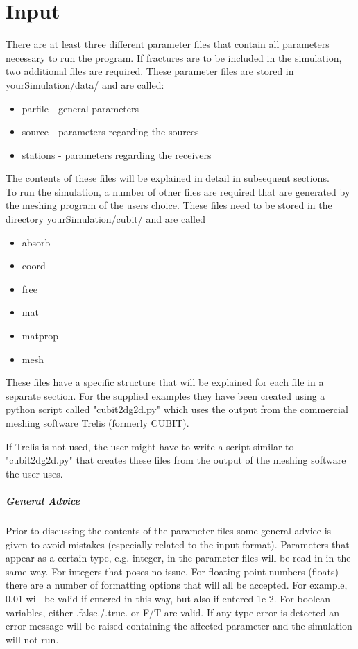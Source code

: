 \chapter{Input}
\label{chap:input}
There are at least three different parameter files that contain all parameters necessary to run the program. If fractures are to be included in the simulation, two additional files are required. These parameter files are stored in \url{yourSimulation/data/} and are called:
\begin{itemize}
	\item parfile - general parameters
	\item source - parameters regarding the sources
	\item stations - parameters regarding the receivers
\end{itemize}  
The contents of these files will be explained in detail in subsequent sections.\\

To run the simulation, a number of other files are required that are generated by the meshing program of the users choice. These files need to be stored in the directory \url{yourSimulation/cubit/} and are called
\begin{itemize}
	\item absorb
	\item coord
	\item free
	\item mat
	\item matprop
	\item mesh
\end{itemize}
These files have a specific structure that will be explained for each file in a separate section. For the supplied examples they have been created using a python script called "cubit2dg2d.py" which uses the output from the commercial meshing software Trelis (formerly CUBIT).

If Trelis is not used, the user might have to write a script similar to "cubit2dg2d.py" that creates these files from the output of the meshing software the user uses.

	\paragraph*{General Advice}
		Prior to discussing the contents of the parameter files some general advice is given to avoid mistakes (especially related to the input format). Parameters that appear as a certain type, e.g. integer, in the parameter files will be read in in the same way. For integers that poses no issue. For floating point numbers (floats) there are a number of formatting options that will all be accepted. For example, 0.01 will be valid if entered in this way, but also if entered 1e-2. For boolean variables, either .false./.true. or F/T are valid. If any type error is detected an error message will be raised containing the affected parameter and the simulation will not run.
		
